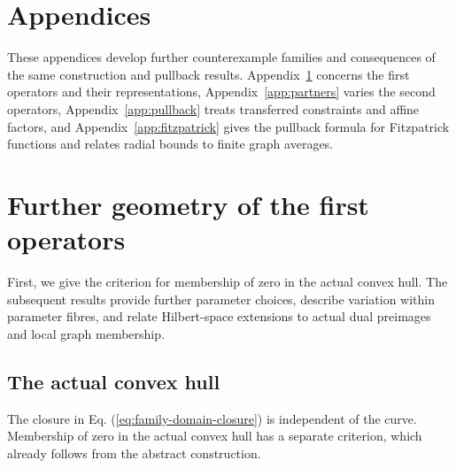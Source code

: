 \documentclass[11pt]{article}
\theoremstyle{definition}
\theoremstyle{remark}
\begin{document}

\appendix
{}

\section*{Appendices}
These appendices develop further counterexample families and consequences of the same construction and pullback results. Appendix~\ref{app:parameters} concerns the first operators and their representations, Appendix~\ref{app:partners} varies the second operators, Appendix~\ref{app:pullback} treats transferred constraints and affine factors, and Appendix~\ref{app:fitzpatrick} gives the pullback formula for Fitzpatrick functions and relates radial bounds to finite graph averages.

\section{Further geometry of the first operators}
\label{app:parameters}

First, we give the criterion for membership of zero in the actual convex hull. The subsequent results provide further parameter choices, describe variation within parameter fibres, and relate Hilbert-space extensions to actual dual preimages and local graph membership.

\subsection{The actual convex hull}
\label{subsec:appendix-convex-hull}

The closure in Eq. (\ref{eq:family-domain-closure}) is independent of the curve. Membership of zero in the actual convex hull has a separate criterion, which already follows from the abstract construction.
\end{document}
